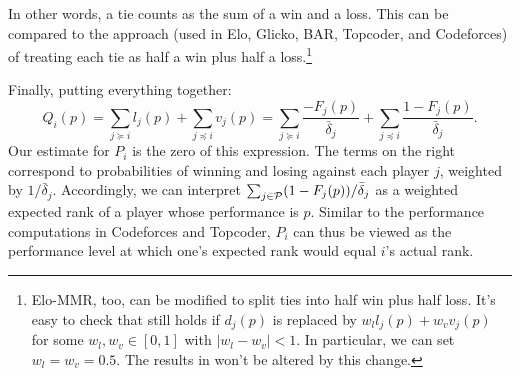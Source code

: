 In other words, a tie counts as the sum of a win and a loss. This can be compared to the approach (used in Elo, Glicko, BAR, Topcoder, and Codeforces) of treating each tie as half a win plus half a loss.\footnote{Elo-MMR, too, can be modified to split ties into half win plus half loss. It's easy to check that  still holds if $d_j(p)$ is replaced by
$w_l l_j(p) + w_v v_j(p)$
for some $w_l,w_v\in [0,1]$ with $|w_l-w_v|<1$.
In particular, we can set $w_l=w_v=0.5$. The results in  won't be altered by this change.}

Finally, putting everything together:
\[Q_i(p) = \sum_{j \succeq i} l_j(p) + \sum_{j \preceq i} v_j(p)
= \sum_{j \succeq i} \frac{-F_j(p)}{\bar\delta_j} + \sum_{j \preceq i} \frac{1 - F_j(p)}{\bar\delta_j}.\]
Our estimate for $P_i$ is the zero of this expression. The terms on the right correspond to probabilities of winning and losing against each player $j$, weighted by $1/\bar\delta_j$. Accordingly, we can interpret $\sum_{j\in \mathcal{P}} (1-F_j(p))/\bar\delta_j$ as a weighted expected rank of a player whose performance is $p$. Similar to the performance computations in Codeforces and Topcoder, $P_i$ can thus be viewed as the performance level at which one's expected rank would equal $i$'s actual rank.

